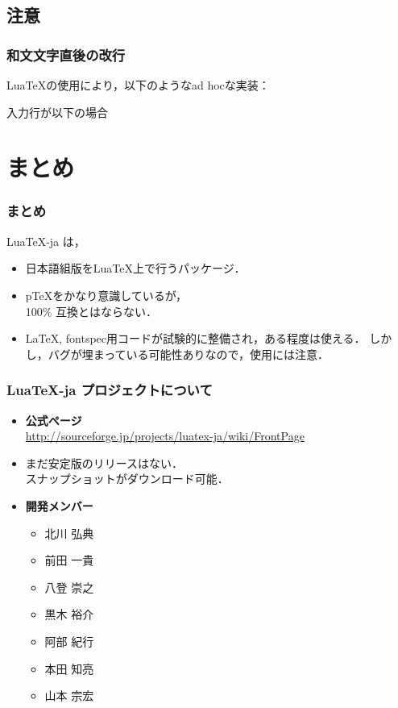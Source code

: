 \documentclass[notheorems,12pt,hyperref={unicode=true}]{beamer}
\begin{document}
\subsection{注意}
\begin{frame}
\frametitle{和文文字直後の改行}
Lua\TeX の使用により，以下のようなad hocな実装：

入力行が以下の場合
\end{frame}

\section*{まとめ}
\begin{frame}
\frametitle{まとめ}
\large Lua\TeX-ja は，
\begin{itemize}
\item 日本語組版をLua\TeX 上で行うパッケージ．
\item p\TeX をかなり意識しているが，\\ 100\% 互換とはならない．
\item \LaTeX, fontspec用コードが試験的に整備され，ある程度は使える．
しかし，バグが埋まっている可能性ありなので，使用には注意．
\end{itemize}
\end{frame}


\begin{frame}
\frametitle{Lua\TeX-ja プロジェクトについて}
\begin{itemize}
\item \textbf{公式ページ}\\
\url{http://sourceforge.jp/projects/luatex-ja/wiki/FrontPage}
\item まだ安定版のリリースはない．\\スナップショットがダウンロード可能．
\item \textbf{開発メンバー}
\begin{itemize}
\item 北川 弘典
\item 前田 一貴
\item 八登 崇之
\item 黒木 裕介
\item 阿部 紀行
\item 本田 知亮
\item 山本 宗宏
\end{itemize}
\end{itemize}
\end{frame}
\end{document}
